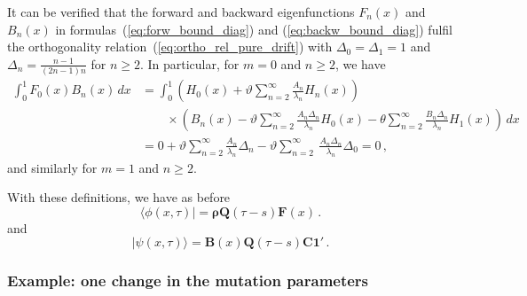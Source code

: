 \documentclass[preprint]{elsarticle}
\newcommand{\bs}[1]{\ensuremath{\boldsymbol{#1}}}
\newcommand\oneC{\ensuremath{\mathbf{1}'}}
\begin{document}
{It can be verified that the forward and backward eigenfunctions $F_n(x)$ and $B_n(x)$ in formulas~(\ref{eq:forw_bound_diag}) and (\ref{eq:backw_bound_diag}) fulfil the orthogonality relation~(\ref{eq:ortho_rel_pure_drift}) with $\Delta_0=\Delta_1=1$ and $\Delta_n=\frac{n-1}{(2n-1)n}$ for $n\geq 2$. 
In particular, for $m=0$ and $n\geq 2$, we have
\begin{equation}
\begin{split}
    \int_0^1 F_0(x)B_n(x)\,dx&=\int_0^1 (H_0(x)+\vartheta \sum_{n=2}^\infty\frac{A_n}{\lambda_n} H_n(x))\\
    &\qquad \times (B_n(x)-\vartheta \sum_{n=2}^\infty\frac{A_n\Delta_n}{\lambda_n} H_0(x)-\theta \sum_{n=2}^\infty\frac{B_n\Delta_n}{\lambda_n} H_1(x))\,dx\\
    &=0+\vartheta \sum_{n=2}^\infty\frac{A_n}{\lambda_n} \Delta_n-\vartheta \sum_{n=2}^\infty\ \frac{A_n\Delta_n}{\lambda_n} \Delta_0=0\,,
\end{split}
\end{equation}
and similarly for $m=1$ and $n\geq 2$. 

With these definitions, we have as before
\begin{equation}
\langle\phi(x,\tau)|=\bs{\rho}\mathbf{Q}(\tau-s)\mathbf{F}(x)\,.
\end{equation}
and
\begin{equation}\label{eq:backw_bound_drift_mat}
|\psi(x,\tau)\rangle=\mathbf{B}(x)\mathbf{Q}(\tau-s)\mathbf{C}\oneC\,.
\end{equation}

\subsubsection{Example: one change in the mutation parameters}

}
\end{document}

